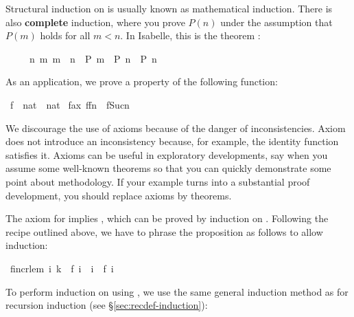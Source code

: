 \begin{isabellebody}
\begin{isamarkuptext}
Structural induction on  is
usually known as mathematical induction. There is also \textbf{complete}
%
induction, where you prove $P(n)$ under the assumption that $P(m)$
holds for all $m<n$. In Isabelle, this is the theorem :
\begin{isabelle}%
\ \ \ \ \ {\isacharparenleft}{\isasymAnd}n{\isachardot}\ {\isasymforall}m{\isachardot}\ m\ {\isacharless}\ n\ {\isasymlongrightarrow}\ P\ m\ {\isasymLongrightarrow}\ P\ n{\isacharparenright}\ {\isasymLongrightarrow}\ P\ n%
\end{isabelle}
As an application, we prove a property of the following
function:%
\end{isamarkuptext}%
\ f\ {\isacharcolon}{\isacharcolon}\ {\isachardoublequote}nat\ {\isasymRightarrow}\ nat{\isachardoublequote}\isanewline
{}\ f{\isacharunderscore}ax{\isacharcolon}\ {\isachardoublequote}f{\isacharparenleft}f{\isacharparenleft}n{\isacharparenright}{\isacharparenright}\ {\isacharless}\ f{\isacharparenleft}Suc{\isacharparenleft}n{\isacharparenright}{\isacharparenright}{\isachardoublequote}%
\begin{isamarkuptext}%
\begin{warn}
We discourage the use of axioms because of the danger of
inconsistencies.  Axiom  does
not introduce an inconsistency because, for example, the identity function
satisfies it.  Axioms can be useful in exploratory developments, say when 
you assume some well-known theorems so that you can quickly demonstrate some
point about methodology.  If your example turns into a substantial proof
development, you should replace axioms by theorems.
\end{warn}\noindent
The axiom for  implies , which can
be proved by induction on \mbox{}. Following the recipe outlined
above, we have to phrase the proposition as follows to allow induction:%
\end{isamarkuptext}%
\ f{\isacharunderscore}incr{\isacharunderscore}lem{\isacharcolon}\ {\isachardoublequote}{\isasymforall}i{\isachardot}\ k\ {\isacharequal}\ f\ i\ {\isasymlongrightarrow}\ i\ {\isasymle}\ f\ i{\isachardoublequote}%
\begin{isamarkuptxt}%
\noindent
To perform induction on  using , we use
the same general induction method as for recursion induction (see
\S\ref{sec:recdef-induction}):%

\end{isamarkuptxt}
\end{isabellebody}
